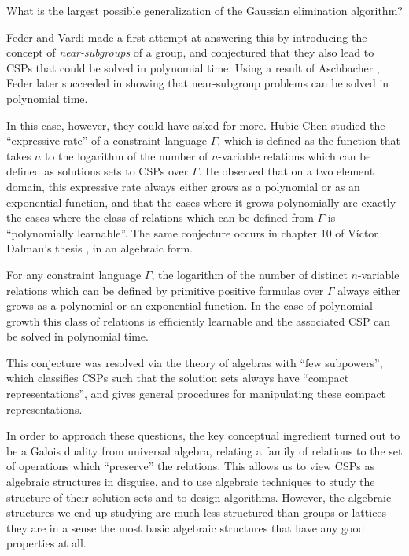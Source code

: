 \begin{prob} What is the largest possible generalization of the Gaussian elimination algorithm?
\end{prob}

Feder and Vardi \cite{feder-vardi} made a first attempt at answering this by introducing the concept of \emph{near-subgroups} of a group, and conjectured that they also lead to CSPs that could be solved in polynomial time. Using a result of Aschbacher \cite{near-subgroups-aschbacher}, Feder \cite{near-subgroups-feder} later succeeded in showing that near-subgroup problems can be solved in polynomial time.

In this case, however, they could have asked for more. Hubie Chen \cite{chen-few-subpowers} studied the ``expressive rate'' of a constraint language $\Gamma$, which is defined as the function that takes $n$ to the logarithm of the number of $n$-variable relations which can be defined as solutions sets to CSPs over $\Gamma$. He observed that on a two element domain, this expressive rate always either grows as a polynomial or as an exponential function, and that the cases where it grows polynomially are exactly the cases where the class of relations which can be defined from $\Gamma$ is ``polynomially learnable''. The same conjecture occurs in chapter 10 of V\'ictor Dalmau's thesis \cite{dalmau-thesis}, in an algebraic form.

\begin{conj} For any constraint language $\Gamma$, the logarithm of the number of distinct $n$-variable relations which can be defined by primitive positive formulas over $\Gamma$ always either grows as a polynomial or an exponential function. In the case of polynomial growth this class of relations is efficiently learnable and the associated CSP can be solved in polynomial time.
\end{conj}

This conjecture was resolved via the theory of algebras with ``few subpowers'', which classifies CSPs such that the solution sets always have ``compact representations'', and gives general procedures for manipulating these compact representations.

In order to approach these questions, the key conceptual ingredient turned out to be a Galois duality from universal algebra, relating a family of relations to the set of operations which ``preserve'' the relations. This allows us to view CSPs as algebraic structures in disguise, and to use algebraic techniques to study the structure of their solution sets and to design algorithms. However, the algebraic structures we end up studying are much less structured than groups or lattices - they are in a sense the most basic algebraic structures that have any good properties at all.

